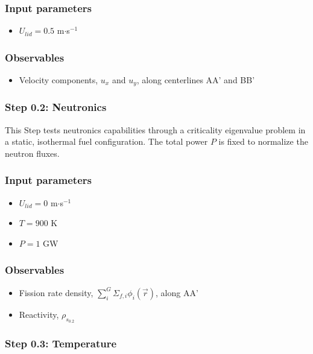 \subsubsection*{Input parameters}
\begin{itemize}
    \item $U_{lid} = 0.5$ m$\cdot$s$^{-1}$
\end{itemize}
%
\subsubsection*{Observables}
\begin{itemize}
    \item Velocity components, $u_x$ and $u_y$, along centerlines AA' and BB'
\end{itemize}

\subsubsection{Step 0.2: Neutronics}

This Step tests neutronics capabilities through a criticality eigenvalue
problem in a static, isothermal fuel configuration. The total power $P$ is
fixed to normalize the neutron fluxes.

\subsubsection*{Input parameters}
\begin{itemize}
    \item $U_{lid} = 0$ m$\cdot$s$^{-1}$
    \item $T = 900$ K
    \item $P = 1$ GW
\end{itemize}
%
\subsubsection*{Observables}
\begin{itemize}
    \item Fission rate density, $\sum^G_i \Sigma_{f,i} \phi_i(\vec{r})$, along
    AA'
    \item Reactivity, $\rho_{s_{0.2}}$
\end{itemize}

\subsubsection{Step 0.3: Temperature}

